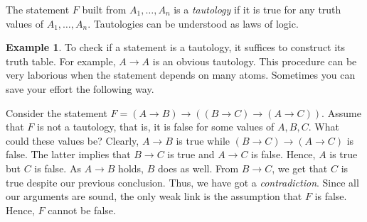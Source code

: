 \documentclass[12pt,notitlepage]{article}
\theoremstyle{plain}
\theoremstyle{definition}
\newtheorem{exm}[thm]{Example}
\theoremstyle{plain}
\newcommand{\1}{\mathbf{1}}
\newcommand{\0}{\mathbf{0}}
\newcommand{\mcomm}[1]{}
\begin{document}
The statement $F$ built from $A_1,\ldots, A_n$ is a \emph{tautology} if it is true for any truth values of $A_1,\ldots,A_n$. Tautologies can be understood as laws of logic.
\begin{exm}
To check if a statement is a tautology, it suffices to construct its truth table. For example, $A \to A$ is an obvious tautology. This procedure can be very laborious when the statement depends on many atoms. Sometimes you can save your effort the following way.

Consider the statement $F = (A \to B) \to ((B \to C) \to (A \to C))$. Assume that $F$ is not a tautology, that is, it is false for some values of $A, B, C$. What could these values be? Clearly, $A \to B$ is true while $(B \to C) \to (A \to C)$ is false. The latter implies that $B \to C$ is true and $A \to C$ is false. Hence, $A$ is true but $C$ is false. As $A \to B$ holds, $B$ does as well. From $B \to C$, we get that $C$ is true despite our previous conclusion. Thus, we have got a \emph{contradiction}. Since all our arguments are sound, the only weak link is the assumption that $F$ is false. Hence, $F$ cannot be false.
\end{exm}
\mcomm{Of course, this version of semantic tableaux can easily come across an explicit branching (say, when $X \to Y$ is true or $X \wedge Y$ is false), which makes its applications much less neat. The Instructor should consider a few of such examples and stress that there is no known `good' algorithm to test \emph{any} formula for being a tautology.}
\end{document}
